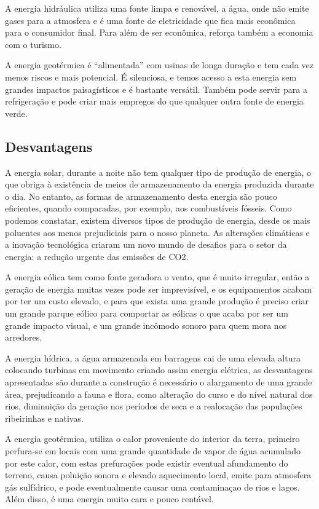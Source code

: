\documentclass{report}
\begin{document}
A energia hidráulica utiliza uma fonte limpa e renovável, a água, onde não emite gases para a atmosfera e é uma fonte de eletricidade que fica mais econômica para o consumidor final. Para além de ser econômica, reforça também a economia com o turismo.


A energia geotérmica é “alimentada” com usinas de longa duração e tem cada vez menos riscos e mais potencial. É silenciosa, e temos acesso a esta energia sem grandes impactos paisagísticos e é bastante versátil. Também pode servir para a refrigeração e pode criar mais empregos do que qualquer outra fonte de energia verde.

\subsection{Desvantagens}

A energia solar, durante a noite não tem qualquer tipo de produção de energia, o que obriga à existência de meios de armazenamento da energia produzida durante o dia. No entanto, as formas de armazenamento desta energia são pouco eficientes, quando comparadas, por exemplo, aos combustíveis fósseis. Como podemos constatar, existem diversos tipos de produção de energia, desde os mais poluentes aos menos prejudiciais para o nosso planeta. As alterações climáticas e a inovação tecnológica criaram um novo mundo de desafios para o setor da energia: a redução urgente das emissões de CO2.

A energia eólica tem como fonte geradora o vento, que é muito irregular, então a geração de energia muitas vezes pode ser imprevisível, e os equipamentos acabam por ter um custo elevado, e para que exista uma grande produção é preciso criar um grande parque eólico para comportar as eólicas o que acaba por ser um grande impacto visual, e um grande incômodo sonoro para quem mora nos arredores.

A energia hídrica, a água armazenada em barragens cai de uma elevada altura colocando turbinas em movimento criando assim energia elétrica, as desvantagens apresentadas são durante a construção é necessário o alargamento de uma grande área, prejudicando a fauna e flora, como alteração do curso e do nível natural dos rios, diminuição da geração nos períodos de seca e a realocação das populações ribeirinhas e nativas.

A energia geotérmica, utiliza o calor proveniente do interior da terra, primeiro perfura-se em locais com uma grande quantidade de vapor de água acumulado por este calor, com estas prefurações pode existir eventual afundamento do terreno, causa poluição sonora e elevado aquecimento local, emite para atmosfera gás sulfídrico, e pode eventualmente causar uma contaminaçao de rios e lagos. Além disso, é uma energia muito cara e pouco rentável.		
\end{document}
